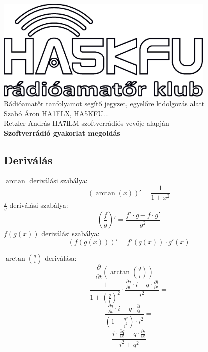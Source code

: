 \documentclass[12pt,a4paper]{article}
\begin{document}
\begin{center}
\includegraphics[width=300pt,keepaspectratio]{figures/ha5kfu.eps}
\\[0.5cm]
Rádióamatőr tanfolyamot segítő jegyzet, egyelőre kidolgozás alatt \\
Szabó Áron HA1FLX, HA5KFU... %
\\
Retzler András HA7ILM szoftverrádiós vevője alapján
\\[1cm]

{\huge \bfseries Szoftverrádió gyakorlat megoldás \\[2cm]}



\end{center}
\subsection{Deriválás}

$\arctan$ deriválási szabálya:
\begin{equation}
\left( \arctan \left( x \right) \right)' = \frac{1}{1 + x^2}
\end{equation}
$\frac{f}{g}$ deriválási szabálya:
\begin{equation}
\left( \frac{f}{g} \right)' = \frac{ f' \cdot g - f  \cdot  g'}{g^2}
\end{equation}
$f(g(x))$ deriválási szabálya:
\begin{equation}
\left( f(g(x)) \right)' = f'(g(x)) \cdot g'(x)
\end{equation}
\vspace{20pt}

$\arctan \left( \frac{q}{i} \right)$ deriválása:
\begin{equation}
\frac{\partial}{\partial t}\left( \arctan \left( \frac{q}{i} \right) \right) = 
\end{equation}
\begin{equation}
\frac{1}{1 + \left( \frac{q}{i} \right)^2} \cdot \frac{\frac{\partial q}{\partial t} \cdot i - q  \cdot \frac{\partial i}{\partial t}}{i^2} =
\end{equation}
\begin{equation}
\frac{\frac{\partial q}{\partial t} \cdot i - q  \cdot \frac{\partial i}{\partial t}}{\left( 1 + \frac{q^2}{i^2} \right) \cdot i^2 } 
=
\end{equation}
\begin{equation}
\frac{i \cdot \frac{\partial q}{\partial t} - q \cdot \frac{\partial i}{\partial t}}{i^2 + q^2}
\end{equation}
\end{document}
